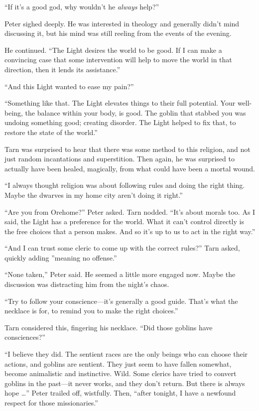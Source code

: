 ``If it's a good god, why wouldn't he \emph{always} help?''

Peter sighed deeply.  He was interested in theology and generally didn't mind discussing it, but his mind was still reeling from the events of the evening.

He continued.  ``The Light desires the world to be good.  If I can make a convincing case that some intervention will help to move the world in that direction, then it lends its assistance.''

``And this Light wanted to ease my pain?''

``Something like that.  The Light elevates things to their full potential.  Your well-being, the balance within your body, is good.  The goblin that stabbed you was undoing something good; creating disorder.  The Light helped to fix that, to restore the state of the world.''

Tarn was surprised to hear that there was some method to this religion, and not just random incantations and superstition.  Then again, he was surprised to actually have been healed, magically, from what could have been a mortal wound.

``I always thought religion was about following rules and doing the right thing.  Maybe the dwarves in my home city aren't doing it right.''

``Are you from Orehome?'' Peter asked.  Tarn nodded.  ``It's about morals too.  As I said, the Light has a preference for the world.  What it can't control directly is the free choices that a person makes.  And so it's up to us to act in the right way.''

``And I can trust some cleric to come up with the correct rules?'' Tarn asked, quickly adding ''meaning no offense.''

``None taken,'' Peter said.  He seemed a little more engaged now.  Maybe the discussion was distracting him from the night's chaos.

``Try to follow your conscience---it's generally a good guide.  That's what the necklace is for, to remind you to make the right choices.''

Tarn considered this, fingering his necklace.  ``Did those goblins have consciences?''

``I believe they did.  The sentient races are the only beings who can choose their actions, and goblins are sentient.  They just seem to have fallen somewhat, become animalistic and instinctive.  Wild.  Some clerics have tried to convert goblins in the past---it never works, and they don't return.  But there is always hope \ldots'' Peter trailed off, wistfully.  Then, ``after tonight, I have a newfound respect for those missionaries.''

